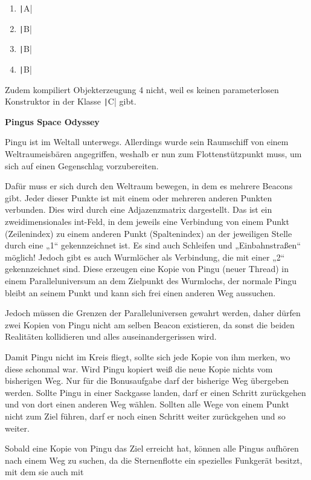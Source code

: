 \documentclass[11pt]{exam} %
\newcommand{\code}[1]{\texttt|#1|}
\begin{document}
\begin{questions}
\begin{solution}
\begin{enumerate}
\item \code{A}\par
\item \code{B}\par
\item \code{B}\par
\item \code{B}\par
\end{enumerate}
Zudem kompiliert Objekterzeugung 4 nicht, weil es keinen parameterlosen Konstruktor in der Klasse \code{C} gibt.
\end{solution}
\question \textbf{Pingus Space Odyssey}\par\nobreak
Pingu ist im Weltall unterwegs. Allerdings wurde sein Raumschiff von einem Weltraumeisbären angegriffen, weshalb er nun zum Flottenstützpunkt muss, um sich auf einen Gegenschlag vorzubereiten.\par
Dafür muss er sich durch den Weltraum bewegen, in dem es mehrere Beacons gibt. Jeder dieser
Punkte ist mit einem oder mehreren anderen Punkten verbunden. Dies wird durch eine
Adjazenzmatrix dargestellt. Das ist ein zweidimensionales int-Feld, in dem jeweils eine Verbindung
von einem Punkt (Zeilenindex) zu einem anderen Punkt (Spaltenindex) an der jeweiligen Stelle
durch eine „1“ gekennzeichnet ist. Es sind auch Schleifen und „Einbahnstraßen“ möglich!
Jedoch gibt es auch Wurmlöcher als Verbindung, die mit einer „2“ gekennzeichnet sind. Diese
erzeugen eine Kopie von Pingu (neuer Thread) in einem Paralleluniversum an dem Zielpunkt des
Wurmlochs, der normale Pingu bleibt an seinem Punkt und kann sich frei einen anderen Weg
aussuchen.\par
Jedoch müssen die Grenzen der Paralleluniversen gewahrt werden, daher dürfen zwei Kopien von
Pingu nicht am selben Beacon existieren, da sonst die beiden Realitäten kollidieren und alles
auseinandergerissen wird.\par
Damit Pingu nicht im Kreis fliegt, sollte sich jede Kopie von ihm merken, wo diese schonmal war.
Wird Pingu kopiert weiß die neue Kopie nichts vom bisherigen Weg. Nur für die Bonusaufgabe darf der bisherige Weg übergeben werden.
Sollte Pingu in einer Sackgasse landen, darf er einen Schritt zurückgehen und von dort einen
anderen Weg wählen. Sollten alle Wege von einem Punkt nicht zum Ziel führen, darf er noch einen
Schritt weiter zurückgehen und so weiter.\par
Sobald eine Kopie von Pingu das Ziel erreicht hat, können alle Pingus aufhören nach einem Weg
zu suchen, da die Sternenflotte ein spezielles Funkgerät besitzt, mit dem sie auch mit

\end{questions}
\end{document}

